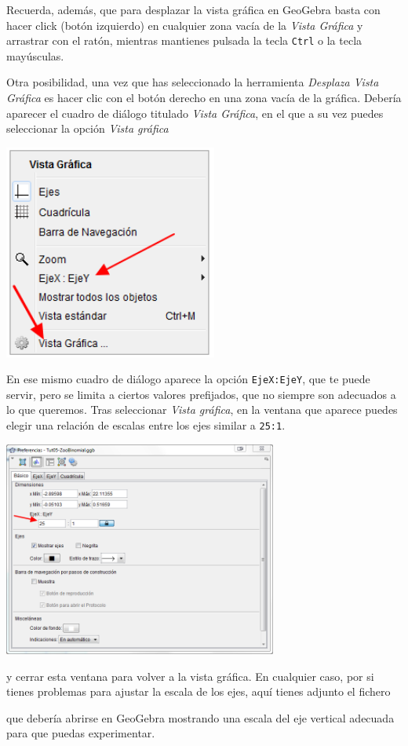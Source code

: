 \documentclass[10pt,a4paper]{article}\usepackage[]{graphicx}\usepackage[]{color}
\begin{document}
Recuerda, además, que para desplazar la vista gráfica en GeoGebra basta con hacer click (botón izquierdo) en cualquier zona vacía de la {\em Vista Gráfica} y arrastrar con el ratón, mientras mantienes pulsada la tecla {\tt Ctrl} o la tecla mayúsculas.

Otra posibilidad, una vez que has seleccionado la herramienta {\em Desplaza Vista Gráfica} es hacer clic con el botón derecho en una zona vacía de la gráfica. Debería aparecer el cuadro de diálogo titulado {\em Vista Gráfica}, en el que a su vez puedes seleccionar la opción {\em Vista gráfica}
\begin{center}
    \includegraphics[width=7cm]{../fig/Tut05-33.png}
\end{center}
En ese mismo cuadro de diálogo aparece la opción {\tt EjeX:EjeY}, que te puede servir, pero se limita a ciertos valores prefijados, que no siempre son adecuados a lo que queremos. Tras seleccionar {\em Vista gráfica}, en la ventana que aparece puedes elegir una relación de escalas entre los ejes similar a {\tt 25:1}.
\begin{center}
    \includegraphics[width=9cm]{../fig/Tut05-34.png}
\end{center}
y cerrar esta ventana para volver a la vista gráfica.  En cualquier caso, por si tienes problemas para ajustar la escala de los ejes, aquí tienes adjunto el fichero
\begin{center}
\end{center}
que debería abrirse en GeoGebra mostrando una escala del eje vertical adecuada para que puedas experimentar.
\end{document}
